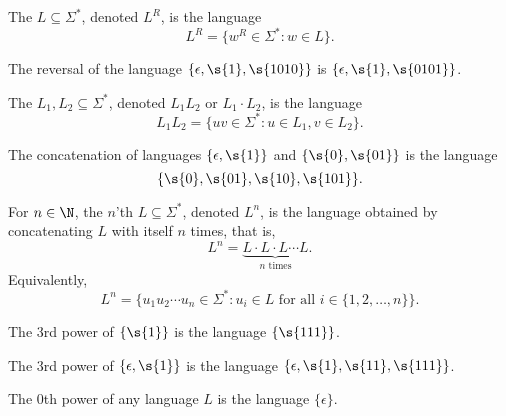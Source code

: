\begin{flex}
\begin{definition} \label{definition:Reversal-of-a-language}
The  $L \subseteq \Sigma^*$, denoted $L^R$, is the language
\[
    L^R = \{w^R \in \Sigma^* : w \in L\}. 
\]
\end{definition}

\begin{example} \label{example:Reversal-of-epsilon-1-1010}
The reversal of the language $\{\epsilon, \s{1}, \s{1010}\}$ is $\{\epsilon, \s{1}, \s{0101}\}$.
\end{example}
\end{flex}


\begin{flex}
\begin{definition} \label{definition:Concatenation-of-languages}
The  $L_1, L_2 \subseteq \Sigma^*$, denoted $L_1L_2$ or $L_1 \cdot L_2$, is the language
\[
    L_1L_2 = \{uv \in \Sigma^* : u \in L_1, v \in L_2\}.
\]
\end{definition}

\begin{example} \label{example:Concatenation-of-epsilon-1-and-0-01}
The concatenation of languages $\{\epsilon, \s{1}\}$ and $\{\s{0}, \s{01}\}$ is the language
\[
    \{\s{0}, \s{01}, \s{10}, \s{101}\}.
\] 
\end{example}
\end{flex}


\begin{flex}
\begin{definition} \label{definition:Powers-of-a-language}
For $n \in \N$, the $n$'th  $L \subseteq \Sigma^*$, denoted $L^n$, is the language obtained by concatenating $L$ with itself $n$ times, that is,
\[
    L^n = \underbrace{L \cdot L \cdot L \cdots L}_{n \text{ times}}.
\]
Equivalently, 
\[
    L^n = \{u_1u_2\cdots u_n \in \Sigma^* : u_i \in L \text{ for all } i \in \{1,2,\ldots,n\}\}.
\] 
\end{definition}

\begin{example}[$\{1\}^3$] \label{example:13}
The 3rd power of $\{\s{1}\}$ is the language $\{\s{111}\}$.
\end{example}

\begin{example}[$\{\epsilon, 1\}^3$] \label{example:epsilon-13}
The 3rd power of $\{\epsilon, \s{1}\}$ is the language $\{\epsilon, \s{1}, \s{11}, \s{111}\}$.
\end{example}

\begin{example}[$L^0$] \label{example:L0}
The 0th power of any language $L$ is the language $\{\epsilon\}$.
\end{example}
\end{flex}


